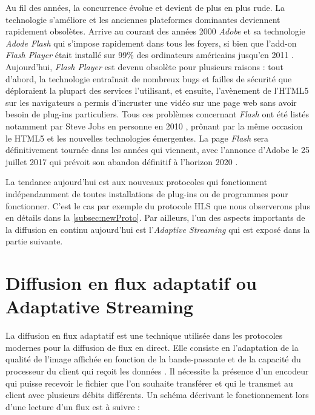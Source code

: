 \documentclass{polytech/polytech}
\begin{document}
Au fil des années, la concurrence évolue et devient de plus en plus rude. La technologie s’améliore et les anciennes plateformes dominantes deviennent rapidement obsolètes. Arrive au courant des années 2000 \textit{Adobe} et sa technologie \textit{Adode Flash} qui s’impose rapidement dans tous les foyers, si bien que l’add-on \textit{Flash Player} était installé sur 99\% des ordinateurs américains jusqu’en 2011 \cite{_chronique_streaming_2010}. Aujourd’hui, \textit{Flash Player} est devenu obsolète pour plusieurs raisons : tout d’abord, la technologie entraînait de nombreux bugs et failles de sécurité que déploraient la plupart des services l’utilisant, et ensuite, l’avènement de l’HTML5 sur les navigateurs a permis d’incruster une vidéo sur une page web sans avoir besoin de plug-ins particuliers. Tous ces problèmes concernant \textit{Flash} ont été listés notamment par Steve Jobs en personne en 2010 \cite{_thoughts_2010}, prônant par la même occasion le HTML5 et les nouvelles technologies émergentes. La page \textit{Flash} sera définitivement tournée dans les années qui viennent, avec l’annonce d’Adobe le 25 juillet 2017 qui prévoit son abandon définitif à l’horizon 2020 \cite{_flash_2017}.

La tendance aujourd’hui est aux nouveaux protocoles qui fonctionnent indépendamment de toutes installations de plug-ins ou de programmes pour fonctionner. C’est le cas par exemple du protocole HLS que nous observerons plus en détails dans la \autoref{subsec:newProto}. Par ailleurs, l’un des aspects importants de la diffusion en continu aujourd’hui est l’\textit{Adaptive Streaming} qui est exposé dans la partie suivante.

\section{Diffusion en flux adaptatif ou Adaptative Streaming}
\label{sec:adaptative_streaming}

La diffusion en flux adaptatif est une technique utilisée dans les protocoles modernes pour la diffusion de flux en direct. Elle consiste en l’adaptation de la qualité de l’image affichée en fonction de la bande-passante et de la capacité du processeur du client qui reçoit les données \cite{_adaptive_2017}. Il nécessite la présence d’un encodeur qui puisse recevoir le fichier que l’on souhaite transférer et qui le transmet au client avec plusieurs débits différents. Un schéma décrivant le fonctionnement lors d’une lecture d’un flux est à suivre :
\end{document}
